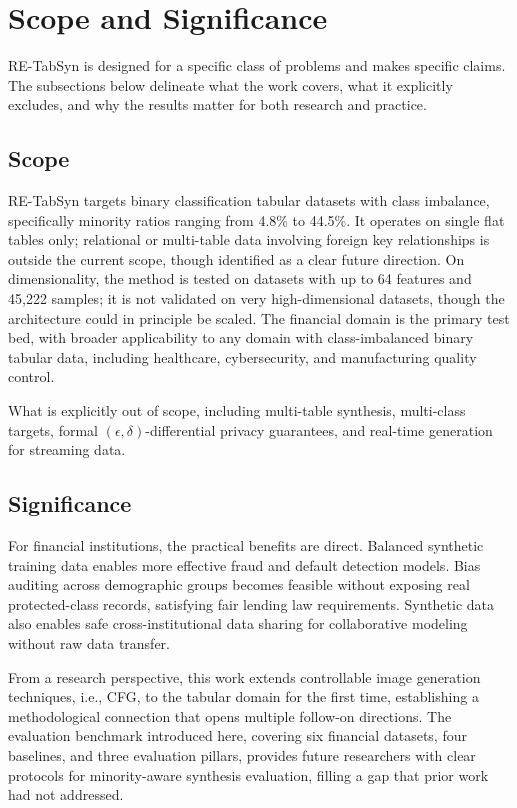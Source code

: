 \section{Scope and Significance}

RE-TabSyn is designed for a specific class of problems and makes specific claims. The subsections below delineate what the work covers, what it explicitly excludes, and why the results matter for both research and practice.

\subsection{Scope}

RE-TabSyn targets binary classification tabular datasets with class imbalance, specifically minority ratios ranging from 4.8\% to 44.5\%. It operates on single flat tables only; relational or multi-table data involving foreign key relationships is outside the current scope, though identified as a clear future direction. On dimensionality, the method is tested on datasets with up to 64 features and 45,222 samples; it is not validated on very high-dimensional datasets, though the architecture could in principle be scaled. The financial domain is the primary test bed, with broader applicability to any domain with class-imbalanced binary tabular data, including healthcare, cybersecurity, and manufacturing quality control.

What is explicitly out of scope, including multi-table synthesis, multi-class targets, formal $(\epsilon, \delta)$-differential privacy guarantees, and real-time generation for streaming data.

\subsection{Significance}

For financial institutions, the practical benefits are direct. Balanced synthetic training data enables more effective fraud and default detection models. Bias auditing across demographic groups becomes feasible without exposing real protected-class records, satisfying fair lending law requirements. Synthetic data also enables safe cross-institutional data sharing for collaborative modeling without raw data transfer.

From a research perspective, this work extends controllable image generation techniques, i.e., CFG, to the tabular domain for the first time, establishing a methodological connection that opens multiple follow-on directions. The evaluation benchmark introduced here, covering six financial datasets, four baselines, and three evaluation pillars, provides future researchers with clear protocols for minority-aware synthesis evaluation, filling a gap that prior work had not addressed.

